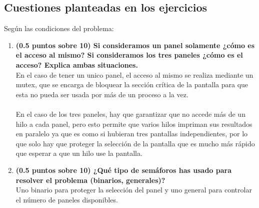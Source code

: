 \documentclass[a4paper,12pt,titlepage,oneside]{article}
\begin{document}
    \subsection{Cuestiones planteadas en los ejercicios}
        Según las condiciones del problema:
        \begin{enumerate}[label=\alph*)]
            \item \textbf{(0.5 puntos sobre 10) Si consideramos un panel solamente ¿cómo es el acceso al mismo? 
            Si consideramos los tres paneles ¿cómo es el acceso? Explica ambas situaciones.}\\
            En el caso de tener un unico panel, el acceso al mismo se realiza mediante un mutex, que se encarga de 
            bloquear la sección crítica de la pantalla para que esta no pueda ser usada por más de un proceso
            a la vez.\\\\
            En el caso de los tres paneles, hay que garantizar que no accede más de un hilo a cada panel,
            pero esto permite que varios hilos impriman sus resultados en paralelo ya que es como si hubieran
            tres pantallas independientes, por lo que solo hay que proteger la selección de la pantalla que es
            mucho más rápido que esperar a que un hilo use la pantalla.
            \item \textbf{(0.5 puntos sobre 10) ¿Qué tipo de semáforos has usado para resolver el problema
            (binarios, generales)?}\\
            Uno binario para proteger la selección del panel y uno general para controlar el número de paneles 
            disponibles.

        \end{enumerate}
        \newpage
\end{document}
